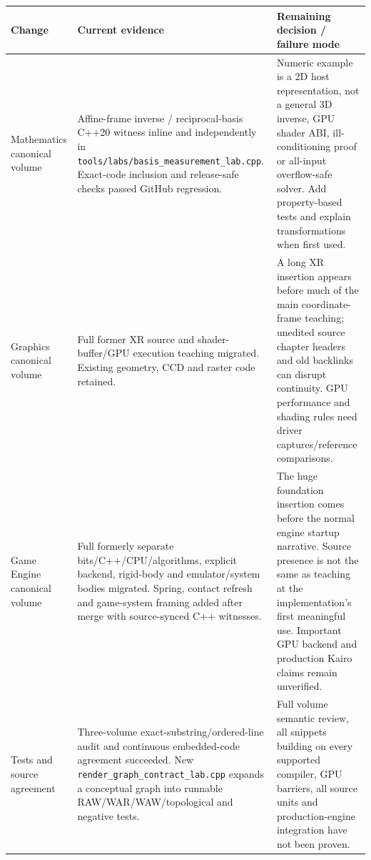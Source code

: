 {\def\LTcaptype{none} %
\begin{longtable}[]{@{}
  >{\raggedright\arraybackslash}p{}
  >{\raggedright\arraybackslash}p{}
  >{\raggedright\arraybackslash}p{}@{}}
\toprule\noalign{}
\begin{minipage}[b]{\linewidth}\raggedright
Change
\end{minipage} & \begin{minipage}[b]{\linewidth}\raggedright
Current evidence
\end{minipage} & \begin{minipage}[b]{\linewidth}\raggedright
Remaining decision / failure mode
\end{minipage} \\
\midrule\noalign{}
\endhead
\bottomrule\noalign{}
\endlastfoot
Mathematics canonical volume & Affine-frame inverse / reciprocal-basis C++20 witness inline and independently in \texttt{tools/labs/basis\_measurement\_lab.cpp}. Exact-code inclusion and release-safe checks passed GitHub regression. & Numeric example is a 2D host representation, not a general 3D inverse, GPU shader ABI, ill-conditioning proof or all-input overflow-safe solver. Add property-based tests and explain transformations when first used. \\
Graphics canonical volume & Full former XR source and shader-buffer/GPU execution teaching migrated. Existing geometry, CCD and raster code retained. & A long XR insertion appears before much of the main coordinate-frame teaching; unedited source chapter headers and old backlinks can disrupt continuity. GPU performance and shading rules need driver captures/reference comparisons. \\
Game Engine canonical volume & Full formerly separate bits/C++/CPU/algorithms, explicit backend, rigid-body and emulator/system bodies migrated. Spring, contact refresh and game-system framing added after merge with source-synced C++ witnesses. & The huge foundation insertion comes before the normal engine startup narrative. Source presence is not the same as teaching at the implementation's first meaningful use. Important GPU backend and production Kairo claims remain unverified. \\
Tests and source agreement & Three-volume exact-substring/ordered-line audit and continuous embedded-code agreement succeeded. New \texttt{render\_graph\_contract\_lab.cpp} expands a conceptual graph into runnable RAW/WAR/WAW/topological and negative tests. & Full volume semantic review, all snippets building on every supported compiler, GPU barriers, all source units and production-engine integration have not been proven. \\

\end{longtable}}
